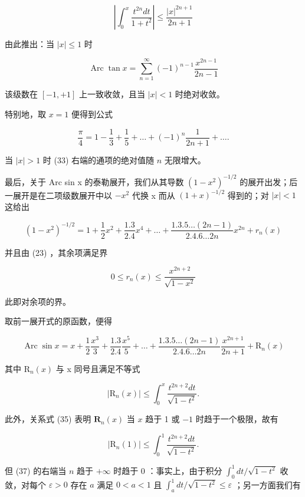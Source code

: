 \[
\left| \int_ {0} ^ {x} \frac {t ^ {2 n} d t}{1 + t ^ {2}} \right| \leqslant \frac {| x | ^ {2 n + 1}}{2 n + 1}\tag{32}
\]

由此推出：当 \(|x| \leqslant 1\) 时

\[
\operatorname{Arc} \tan x = \sum_ {n = 1} ^ {\infty} (- 1) ^ {n - 1} \frac {x ^ {2 n - 1}}{2 n - 1}\tag{33}
\]

该级数在 \([-1,+1]\) 上一致收敛，且当 \(|x|<1\) 时绝对收敛。

特别地，取 \(x = 1\) 便得到公式

\[
{\frac {\pi}{4}} = 1 - {\frac {1}{3}} + {\frac {1}{5}} + \dots + (- 1) ^ {n} {\frac {1}{2 n + 1}} + \dots .\tag{34}
\]

当 \(|x| > 1\) 时 (33) 右端的通项的绝对值随 \(n\) 无限增大。

最后，关于 Arc sin x 的泰勒展开，我们从其导数 \((1 - x^{2})^{-1/2}\) 的展开出发；后一展开是在二项级数展开中以 \(-x^{2}\) 代换 x 而从 \((1 + x)^{-1/2}\) 得到的；对 \(|x| < 1\) 这给出

\[
(1 - x ^ {2}) ^ {- 1 / 2} = 1 + \frac {1}{2} x ^ {2} + \frac {1 . 3}{2 . 4} x ^ {4} + \dots + \frac {1 . 3 . 5 \dots (2 n - 1)}{2 . 4 . 6 \dots 2 n} x ^ {2 n} + r _ {n} (x)
\]

并且由 (23) ，其余项满足界

\[
0 \leqslant r _ {n} (x) \leqslant \frac {x ^ {2 n + 2}}{\sqrt {1 - x ^ {2}}}
\]

此即对余项的界。

取前一展开式的原函数，便得

\[
\operatorname{Arc} \sin x = x + \frac {1}{2} \frac {x ^ {3}}{3} + \frac {1 . 3}{2 . 4} \frac {x ^ {5}}{5} + \dots + \frac {1 . 3 . 5 \dots (2 n - 1)}{2 . 4 . 6 \dots 2 n} \frac {x ^ {2 n + 1}}{2 n + 1} + \mathrm{R} _ {n} (x)\tag{35}
\]

其中 \(\mathrm{R}_{n}(x)\) 与 x 同号且满足不等式

\[
| \mathrm{R} _ {n} (x) | \leqslant \int_ {0} ^ {x} \frac {t ^ {2 n + 2} d t}{\sqrt {1 - t ^ {2}}}.\tag{36}
\]

此外，关系式 (35) 表明 \(\mathbf{R}_n(x)\) 当 \(x\) 趋于 1 或 \(-1\) 时趋于一个极限，故有

\[
| \mathrm{R} _ {n} (1) | \leqslant \int_ {0} ^ {1} \frac {t ^ {2 n + 2} d t}{\sqrt {1 - t ^ {2}}}.\tag{37}
\]

但 (37) 的右端当 \(n\) 趋于 \(+\infty\) 时趋于 0 ：事实上，由于积分 \(\int_0^1 dt / \sqrt{1 - t^2}\) 收敛，对每个 \(\varepsilon > 0\) 存在 \(a\) 满足 \(0 < a < 1\) 且 \(\int_a^1 dt / \sqrt{1 - t^2} \leqslant \varepsilon\) ；另一方面我们有

